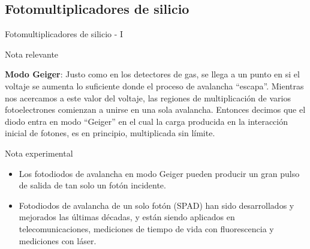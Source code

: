 \documentclass[a4paper,10pt]{beamer}
\begin{document}
\subsection{Fotomultiplicadores de silicio}
\begin{frame}{Fotomultiplicadores de silicio - I}

\begin{block}{Nota relevante}
 \begin{justify}
  \textbf{Modo Geiger}: Justo como en los detectores de gas, se llega a un punto en 
  si el voltaje se aumenta lo suficiente donde el proceso de avalancha ``escapa''. Mientras 
  nos acercamos a este valor del voltaje, las regiones de multiplicación de varios 
  fotoelectrones comienzan a unirse en una sola avalancha. Entonces decimos que el 
  diodo entra en modo ``Geiger'' en el cual la carga producida en la interacción inicial 
  de fotones, es en principio, multiplicada sin límite.
 \end{justify}
\end{block}

\begin{exampleblock}{Nota experimental}
 \begin{itemize}
  \item \begin{justify}
         Los fotodiodos de avalancha en modo Geiger pueden producir un gran pulso de 
         salida de tan solo un fotón incidente.
        \end{justify}
  \item \begin{justify}
         Fotodiodos de avalancha de un solo fotón (SPAD) han sido desarrollados y mejorados 
         las últimas décadas, y están siendo aplicados en telecomunicaciones, mediciones 
         de tiempo de vida con fluorescencia y mediciones con láser. 
        \end{justify}


 \end{itemize}

\end{exampleblock}
\end{frame}
\end{document}

